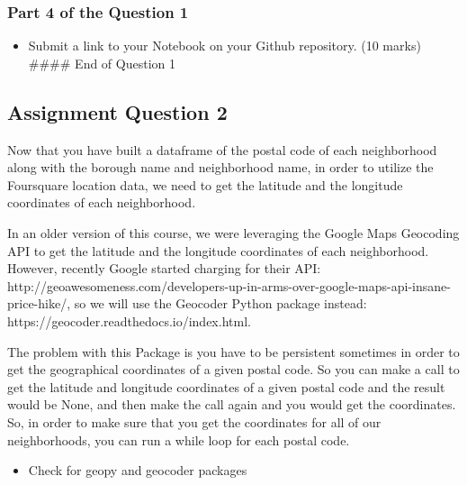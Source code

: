 \documentclass[11pt]{article}
\providecommand{\tightlist}{%
      \setlength{\itemsep}{0pt}\setlength{\parskip}{0pt}}
\begin{document}
    \hypertarget{part-4-of-the-question-1}{%
\subsubsection{Part 4 of the Question
1}\label{part-4-of-the-question-1}}

\begin{itemize}
\tightlist
\item
  Submit a link to your Notebook on your Github repository. (10 marks)
  \#\#\#\# End of Question 1
\end{itemize}

    \hypertarget{assignment-question-2}{%
\subsection{Assignment Question 2}\label{assignment-question-2}}

Now that you have built a dataframe of the postal code of each
neighborhood along with the borough name and neighborhood name, in order
to utilize the Foursquare location data, we need to get the latitude and
the longitude coordinates of each neighborhood.

In an older version of this course, we were leveraging the Google Maps
Geocoding API to get the latitude and the longitude coordinates of each
neighborhood. However, recently Google started charging for their API:
http://geoawesomeness.com/developers-up-in-arms-over-google-maps-api-insane-price-hike/,
so we will use the Geocoder Python package instead:
https://geocoder.readthedocs.io/index.html.

The problem with this Package is you have to be persistent sometimes in
order to get the geographical coordinates of a given postal code. So you
can make a call to get the latitude and longitude coordinates of a given
postal code and the result would be None, and then make the call again
and you would get the coordinates. So, in order to make sure that you
get the coordinates for all of our neighborhoods, you can run a while
loop for each postal code.

    \begin{itemize}
\tightlist
\item
  Check for geopy and geocoder packages
\end{itemize}
\end{document}
